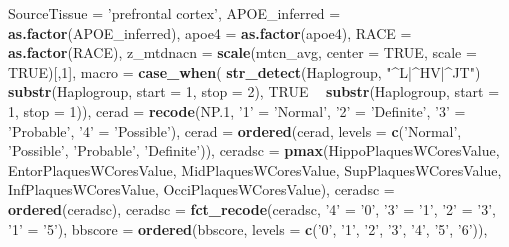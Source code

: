 \documentclass[]{book}
\newenvironment{Shaded}{\begin{snugshade}}{\end{snugshade}}
\newcommand{\DataTypeTok}[1]{\textcolor[rgb]{0.13,0.29,0.53}{#1}}
\newcommand{\DecValTok}[1]{\textcolor[rgb]{0.00,0.00,0.81}{#1}}
\newcommand{\FloatTok}[1]{\textcolor[rgb]{0.00,0.00,0.81}{#1}}
\newcommand{\KeywordTok}[1]{\textcolor[rgb]{0.13,0.29,0.53}{\textbf{#1}}}
\newcommand{\NormalTok}[1]{#1}
\newcommand{\OperatorTok}[1]{\textcolor[rgb]{0.81,0.36,0.00}{\textbf{#1}}}
\newcommand{\OtherTok}[1]{\textcolor[rgb]{0.56,0.35,0.01}{#1}}
\newcommand{\StringTok}[1]{\textcolor[rgb]{0.31,0.60,0.02}{#1}}
\begin{document}
\begin{Shaded}
\begin{Highlighting}[]
{{{{{{{{{{{{        \DataTypeTok{SourceTissue =} \StringTok{'prefrontal cortex'}\NormalTok{,}
        \DataTypeTok{APOE_inferred =} \KeywordTok{as.factor}\NormalTok{(APOE_inferred), }
        \DataTypeTok{apoe4 =} \KeywordTok{as.factor}\NormalTok{(apoe4), }
        \DataTypeTok{RACE =} \KeywordTok{as.factor}\NormalTok{(RACE), }
        \DataTypeTok{z_mtdnacn =} \KeywordTok{scale}\NormalTok{(mtcn_avg, }\DataTypeTok{center =} \OtherTok{TRUE}\NormalTok{, }\DataTypeTok{scale =} \OtherTok{TRUE}\NormalTok{)[,}\DecValTok{1}\NormalTok{],}
        \DataTypeTok{macro =} \KeywordTok{case_when}\NormalTok{(}
          \KeywordTok{str_detect}\NormalTok{(Haplogroup, }\StringTok{"^L|^HV|^JT"}\NormalTok{) }\OperatorTok{~}\StringTok{ }\KeywordTok{substr}\NormalTok{(Haplogroup, }\DataTypeTok{start =} \DecValTok{1}\NormalTok{, }\DataTypeTok{stop =} \DecValTok{2}\NormalTok{),}
                     \OtherTok{TRUE} \OperatorTok{~}\StringTok{ }\KeywordTok{substr}\NormalTok{(Haplogroup, }\DataTypeTok{start =} \DecValTok{1}\NormalTok{, }\DataTypeTok{stop =} \DecValTok{1}\NormalTok{)),}
        \DataTypeTok{cerad =} \KeywordTok{recode}\NormalTok{(NP}\FloatTok{.1}\NormalTok{, }\StringTok{'1'}\NormalTok{ =}\StringTok{ 'Normal'}\NormalTok{, }\StringTok{'2'}\NormalTok{ =}\StringTok{ 'Definite'}\NormalTok{, }\StringTok{'3'}\NormalTok{ =}\StringTok{ 'Probable'}\NormalTok{, }\StringTok{'4'}\NormalTok{ =}\StringTok{ 'Possible'}\NormalTok{),}
        \DataTypeTok{cerad =} \KeywordTok{ordered}\NormalTok{(cerad, }\DataTypeTok{levels =} \KeywordTok{c}\NormalTok{(}\StringTok{'Normal'}\NormalTok{, }\StringTok{'Possible'}\NormalTok{, }\StringTok{'Probable'}\NormalTok{, }\StringTok{'Definite'}\NormalTok{)),}
        \DataTypeTok{ceradsc =} \KeywordTok{pmax}\NormalTok{(HippoPlaquesWCoresValue, EntorPlaquesWCoresValue, MidPlaquesWCoresValue, }
\NormalTok{                       SupPlaquesWCoresValue, InfPlaquesWCoresValue, OcciPlaquesWCoresValue),}
        \DataTypeTok{ceradsc =} \KeywordTok{ordered}\NormalTok{(ceradsc),}
        \DataTypeTok{ceradsc =} \KeywordTok{fct_recode}\NormalTok{(ceradsc, }\StringTok{'4'}\NormalTok{ =}\StringTok{ '0'}\NormalTok{, }\StringTok{'3'}\NormalTok{ =}\StringTok{ '1'}\NormalTok{, }\StringTok{'2'}\NormalTok{ =}\StringTok{ '3'}\NormalTok{, }\StringTok{'1'}\NormalTok{ =}\StringTok{ '5'}\NormalTok{),}
        \DataTypeTok{bbscore =} \KeywordTok{ordered}\NormalTok{(bbscore, }\DataTypeTok{levels =} \KeywordTok{c}\NormalTok{(}\StringTok{'0'}\NormalTok{, }\StringTok{'1'}\NormalTok{, }\StringTok{'2'}\NormalTok{, }\StringTok{'3'}\NormalTok{, }\StringTok{'4'}\NormalTok{, }\StringTok{'5'}\NormalTok{, }\StringTok{'6'}\NormalTok{)),}
}}}}}}}}}}}}
\end{Highlighting}
\end{Shaded}
\end{document}
